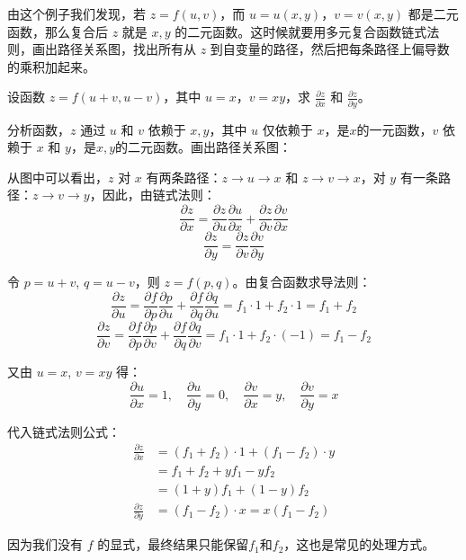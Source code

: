 由这个例子我们发现，若 $z = f(u,v)$，而 $u = u(x,y)$，$v = v(x,y)$ 都是二元函数，那么复合后 $z$ 就是 $x,y$ 的二元函数。这时候就要用多元复合函数链式法则，画出路径关系图，找出所有从 $z$ 到自变量的路径，然后把每条路径上偏导数的乘积加起来。

\begin{myexample}
  设函数 $z = f(u+v, u-v)$，其中 $u = x$，$v = xy$，求 $\frac{\partial z}{\partial x}$ 和 $\frac{\partial z}{\partial y}$。

  分析函数，$z$ 通过 $u$ 和 $v$ 依赖于 $x,y$，其中 $u$ 仅依赖于 $x$，是$x$的一元函数，$v$ 依赖于 $x$ 和 $y$，是$x,y$的二元函数。画出路径关系图：
  \begin{center}
  \end{center}

  从图中可以看出，$z$ 对 $x$ 有两条路径：$z \to u \to x$ 和 $z \to v \to x$，对 $y$ 有一条路径：$z \to v \to y$，因此，由链式法则：
  \[
  \frac{\partial z}{\partial x} = \frac{\partial z}{\partial u}\frac{\partial u}{\partial x}
    + \frac{\partial z}{\partial v}\frac{\partial v}{\partial x}
  \]
  \[
  \frac{\partial z}{\partial y} = \frac{\partial z}{\partial v}\frac{\partial v}{\partial y}
  \]

  令 $p = u+v$, $q = u-v$，则 $z = f(p,q)$。由复合函数求导法则：
  \[
  \frac{\partial z}{\partial u} = \frac{\partial f}{\partial p}\frac{\partial p}{\partial u}
    + \frac{\partial f}{\partial q}\frac{\partial q}{\partial u}
    = f_1 \cdot 1 + f_2 \cdot 1 = f_1 + f_2
  \]
  \[
  \frac{\partial z}{\partial v} = \frac{\partial f}{\partial p}\frac{\partial p}{\partial v}
    + \frac{\partial f}{\partial q}\frac{\partial q}{\partial v}
    = f_1 \cdot 1 + f_2 \cdot (-1) = f_1 - f_2
  \]

  又由 $u = x$, $v = xy$ 得：
  \[
  \frac{\partial u}{\partial x} = 1,\quad \frac{\partial u}{\partial y} = 0,\quad
  \frac{\partial v}{\partial x} = y,\quad \frac{\partial v}{\partial y} = x
  \]

  代入链式法则公式：
  \begin{align*}
    \frac{\partial z}{\partial x}
    &= (f_1 + f_2) \cdot 1 + (f_1 - f_2) \cdot y \\
    &= f_1 + f_2 + y f_1 - y f_2 \\
    &= (1+y)f_1 + (1-y)f_2 \\[6pt]
    \frac{\partial z}{\partial y}
    &= (f_1 - f_2) \cdot x = x(f_1 - f_2)
  \end{align*}

  因为我们没有 $f$ 的显式，最终结果只能保留$f_1$和$f_2$，这也是常见的处理方式。
\end{myexample}

